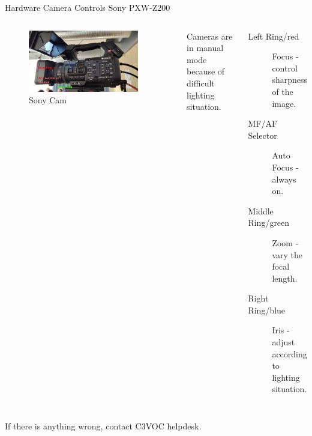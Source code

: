 
\begin{frame}{Hardware Camera Controls Sony PXW-Z200}
	\begin{columns}[T,onlytextwidth]
	\begin{figure}
		\centering
		\includegraphics[width=0.9\textwidth]{images/sony-side-annotated.jpg}
		\caption{Sony Cam}
	\end{figure}
		Cameras are in manual mode because of difficult lighting situation.
		\begin{description}
			\item[Left Ring/red] Focus - control sharpness of the image.
			\item[MF/AF Selector] Auto Focus - always on.
			\item[Middle Ring/green] Zoom - vary the focal length.
			\item[Right Ring/blue] Iris - adjust according to lighting situation.
		\end{description}
	\end{columns}
  If there is anything wrong, contact C3VOC helpdesk.
\end{frame}

